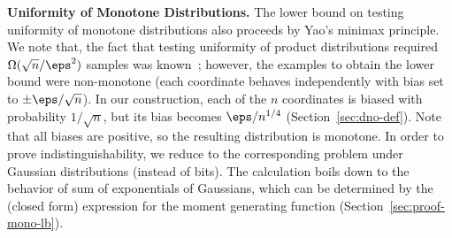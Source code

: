 \noindent\textbf{Uniformity of Monotone Distributions.} The lower bound on testing uniformity of monotone distributions also proceeds by Yao's minimax principle. We note that, the fact that testing uniformity of product distributions required $\Omega(\sqrt{n}/\eps^2)$ samples was known~\cite{CDKS17}; however, the examples to obtain the lower bound were non-monotone (each coordinate behaves independently with bias set to $\pm \eps / \sqrt{n}$). In our construction, each of the $n$ coordinates is biased with probability $1/\sqrt{n}$, but its bias becomes $\eps / n^{1/4}$ (Section~\ref{sec:dno-def}). Note that all biases are positive, so the resulting distribution is monotone. 
%
In order to prove indistinguishability, we reduce to the corresponding problem under Gaussian distributions (instead of bits). The calculation
boils down to the behavior of sum of exponentials of Gaussians, which can be determined by the (closed form) expression for the moment generating function (Section~\ref{sec:proof-mono-lb}).

